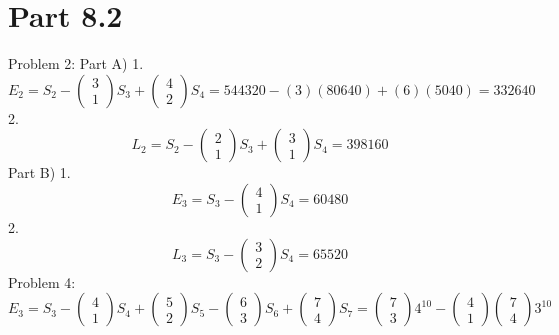 \documentclass{article}
\begin{document}
\section{Part 8.2}
Problem 2: Part A)
1.
$$
E_2=S_2
-
\left(\begin{array}{c}
3\\
1
\end{array}\right)
S_3
+
\left(\begin{array}{c}
4\\
2
\end{array}\right)
S_4
=
544320
-
(3)(80640)
+
(6)(5040)
=
332640
$$
2.
$$
L_2=S_2
-
\left(\begin{array}{c}
2\\
1
\end{array}\right)
S_3
+
\left(\begin{array}{c}
3\\
1
\end{array}\right)
S_4
=
398160
$$
Part B)
1.
$$
E_3=S_3-
\left(\begin{array}{c}
4\\
1
\end{array}\right)
S_4
=
60480
$$
2.
$$
L_3=S_3-
\left(\begin{array}{c}
3\\
2
\end{array}\right)
S_4
=
65520
$$
Problem 4:
$$
E_3=S_3-
\left(\begin{array}{c}
4\\
1
\end{array}\right)
S_4
+
\left(\begin{array}{c}
5\\
2
\end{array}\right)
S_5
-
\left(\begin{array}{c}
6\\
3
\end{array}\right)
S_6
+
\left(\begin{array}{c}
7\\
4
\end{array}\right)
S_7
=
\left(\begin{array}{c}
7\\
3
\end{array}\right)
4^{10}
-
\left(\begin{array}{c}
4\\
1
\end{array}\right)
\left(\begin{array}{c}
7\\
4
\end{array}\right)
3^{10}
$$
\end{document}
